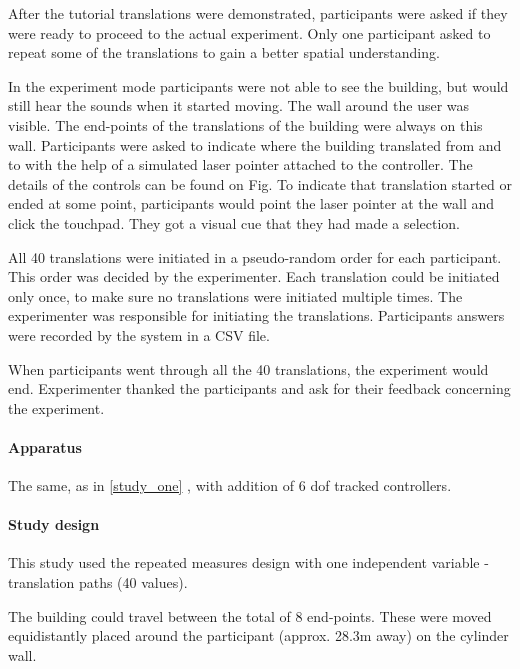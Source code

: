 After the tutorial translations were demonstrated, participants were asked if they were ready to proceed to the actual experiment. Only one participant asked to repeat some of the translations to gain a better spatial understanding.

In the experiment mode participants were not able to see the building, but would still hear the sounds when it started moving. The wall around the user was visible. The end-points of the translations of the building were always on this wall. Participants were asked to indicate where the building translated from and to with the help of a simulated laser pointer attached to the controller. The details of the controls can be found on Fig. %
To indicate that translation started or ended at some point, participants would point the laser pointer at the wall and click the touchpad. They got a visual cue that they had made a selection.

All 40 translations were initiated in a pseudo-random order for each participant. This order was decided by the experimenter. Each translation could be initiated only once, to make sure no translations were initiated multiple times. The experimenter was responsible for  initiating the translations. 
Participants answers were recorded by the system in a CSV file.

When participants went through all the 40 translations, the experiment would end. Experimenter thanked the participants and ask for their feedback concerning the experiment.

\paragraph{Apparatus} The same, as in \ref{study_one} , with addition of 6 \gls{dof} tracked controllers.

\paragraph{Study design}
This study used the repeated measures design with one independent variable - translation paths (40 values).

The building could travel between the total of 8 end-points. These were moved equidistantly placed around the participant (approx. 28.3m away) on the cylinder wall.

